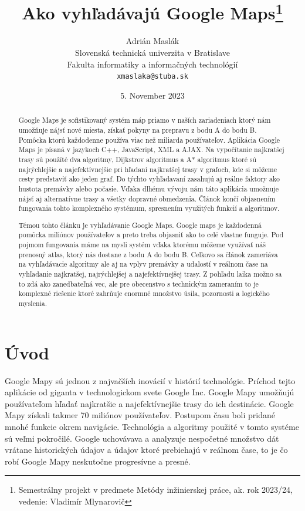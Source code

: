 \documentclass[10pt,twoside,slovak,a4paper]{article}
\title{Ako vyhľadávajú Google Maps\thanks{Semestrálny projekt v predmete Metódy inžinierskej práce, ak. rok 2023/24, vedenie: Vladimír Mlynarovič}} %
\author{Adrián Maslák\\[2pt]
	{\small Slovenská technická univerzita v Bratislave}\\
	{\small Fakulta informatiky a informačných technológií}\\
	{\small \texttt{xmaslaka@stuba.sk}}
	}
\date{\small 5. November 2023} %
\begin{document}
\maketitle

\begin{abstract}
Google Maps je sofistikovaný systém máp priamo v naších zariadeniach ktorý nám umožňuje nájsť nové miesta, získať pokyny na prepravu z bodu A do bodu B. Pomôcka ktorú každodenne používa viac než miliarda používateľov.
	Aplikácia Google Maps je písaná v jazykoch C++, JavaScript, XML a AJAX.  Na vypočítanie najkratšej trasy sú použíté dva algoritmy, Dijkstrov algoritmus a A* algoritmus ktoré sú najrýchlejšie a najefektívnejšie pri hľadaní najkratšej trasy v grafoch, kde si môžeme cesty predstaviť ako jeden graf. Do týchto vyhľadavaní zasahujú aj reálne faktory ako hustota premávky alebo počasie. Vďaka dlhému vývoju nám táto aplikácia umožnuje nájsť aj alternatívne trasy a všetky dopravné obmedzenia.
	Článok končí objasnením fungovania tohto komplexného systémum, spresnením využitých funkcií a algoritmov.

Témou tohto článku je vyhľadávanie Google Maps. Google maps je každodenná pomôcka miliónov používateľov a preto treba objasniť ako to celé vlastne funguje. Pod pojmom fungovania máme na mysli systém vďaka ktorému môžeme využívať náš prenosný atlas, ktorý nás dostane z bodu A do bodu B. Celkovo sa článok zameriáva na vyhľadávacie algoritmy ale aj na vplyv premávky a udalostí v reálnom čase na vyhľadanie najkratšej, najrýchlejšej a najefektívnejšej trasy. Z pohľadu laika možno sa to zdá ako zanedbateľná vec, ale pre obecenstvo s technickým zameraním to je komplexné riešenie ktoré zahrňuje enormné množstvo úsila, pozornosti a logického myslenia. 
\end{abstract}



\section{Úvod}

Google Mapy sú jednou z najvačších inovácií v histórií technológie. Príchod tejto aplikácie od giganta v technologickom svete Google Inc. Google Mapy umožňujú používateľom hľadať najkratšie a najefektívnejšie trasy do ich destinácie. Google Mapy získali takmer 70 miliónov používateľov. Postupom času boli pridané mnohé funkcie okrem navigácie. Technológia a algoritmy použité v tomto systéme sú veľmi pokročilé. Google uchovávava a analyzuje nespočetné množstvo dát vrátane historických údajov a údajov ktoré prebiehajú v reálnom čase, to je čo robí Google Mapy neskutočne progresívne a presné.
\end{document}
